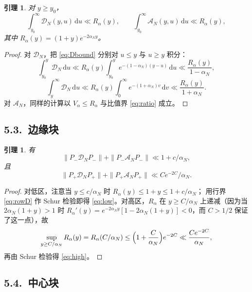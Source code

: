 \documentclass[12pt,a4paper]{amsart}
\numberwithin{equation}{section}
\theoremstyle{plain}
\newtheorem{lemma}[theorem]{引理}
\theoremstyle{definition}
\newcommand{\dd}{\,\mathrm{d}}
\begin{document}
\begin{lemma}\label{lem:rows}
对 $y\ge y_0$，
\begin{equation}\label{eq:rowD}
 \int_{y_0}^{\infty}\mathscr D_N(y,u)\dd u\ll R_\alpha(y),
 \qquad
 \int_{y_0}^{\infty}\mathscr A_N(y,u)\dd u\ll R_\alpha(y),
\end{equation}
其中 $R_\alpha(y)=(1+y)e^{-2\alpha_Ny}$。
\end{lemma}

\begin{proof}
对 $\mathscr D_N$，把 \eqref{eq:Dbound} 分别对 $u\le y$ 与 $u\ge y$ 积分：
\[
 \int_{y_0}^{y}\mathscr D_N\dd u\ll R_\alpha(y)\int_{y_0}^{y}
 e^{-(1-\alpha_N)(y-u)}\dd u\ll\frac{R_\alpha(y)}{1-\alpha_N},
\]
\[
 \int_{y}^{\infty}\mathscr D_N\dd u\ll R_\alpha(y)
 \int_0^{\infty}e^{-(1+\alpha_N)v}\dd v\ll\frac{R_\alpha(y)}{1+\alpha_N}.
\]
对 $\mathscr A_N$，同样的计算以 $V_\alpha\le R_\alpha$ 与比值界 \eqref{eq:ratio}
成立。
\end{proof}

\subsection*{5.3.\ 边缘块}

\begin{lemma}\label{lem:edge}
有
\begin{equation}\label{eq:low}
 \|P_-\mathcal D_NP_-\|+\|P_-\mathscr A_NP_-\|\ll1+c/\alpha_N,
\end{equation}
且
\begin{equation}\label{eq:high}
 \|P_+\mathcal D_NP_+\|+\|P_+\mathscr A_NP_+\|\ll Ce^{-2C}/\alpha_N .
\end{equation}
\end{lemma}

\begin{proof}
对低区，注意当 $y\le c/\alpha_N$ 时 $R_\alpha(y)\le1+y\le1+c/\alpha_N$；
用行界 \eqref{eq:rowD} 作 Schur 检验即得 \eqref{eq:low}。对高区，$R_\alpha$ 在
$y\ge C/\alpha_N$ 上递减（因为当 $2\alpha_N(1+y)>1$ 时
$R_\alpha'(y)=e^{-2\alpha_Ny}[1-2\alpha_N(1+y)]<0$，而 $C>1/2$ 保证了这一点），故
\[
 \sup_{y\ge C/\alpha_N}R_\alpha(y)=R_\alpha(C/\alpha_N)
 \le\Bigl(1+\frac C{\alpha_N}\Bigr)e^{-2C}\ll\frac{Ce^{-2C}}{\alpha_N},
\]
再由 Schur 检验得 \eqref{eq:high}。
\end{proof}

\subsection*{5.4.\ 中心块}
\end{document}
